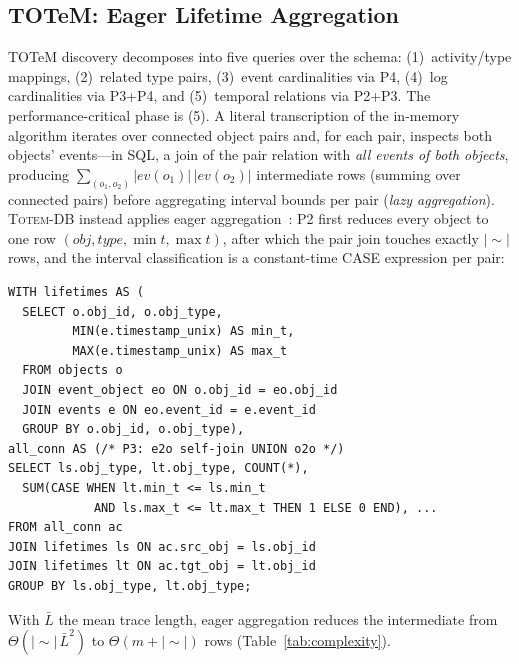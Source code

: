 \documentclass[sigconf, nonacm]{acmart}
\newcommand{\sys}{\textsc{Totem-DB}\xspace}
\begin{document}
\subsection{TOTeM: Eager Lifetime Aggregation}
\label{sec:totem-sql}

\sloppy
TOTeM discovery decomposes into five queries over the schema: (1)~activity/type mappings, (2)~related type pairs, (3)~event cardinalities via P4, (4)~log cardinalities via P3+P4, and (5)~temporal relations via P2+P3. The performance-critical phase is (5). A literal transcription of the in-memory algorithm iterates over connected object pairs and, for each pair, inspects both objects' events---in SQL, a join of the pair relation with \emph{all events of both objects}, producing $\sum_{(o_1,o_2)} |\mathit{ev}(o_1)|\,|\mathit{ev}(o_2)|$ intermediate rows (summing over connected pairs) before aggregating interval bounds per pair (\emph{lazy aggregation}). \sys instead applies eager aggregation~\cite{yan1995eager}: P2 first reduces every object to one row $(\mathit{obj}, \mathit{type}, \min t, \max t)$, after which the pair join touches exactly $|{\sim}|$ rows, and the interval classification is a constant-time CASE expression per pair:\par\fussy

\begin{lstlisting}[caption={TOTeM temporal relations (P2+P3, abbreviated): lifetimes are aggregated before the pair join; the four CASE sums classify interval containment and overlap order.},label={lst:totem}]
WITH lifetimes AS (
  SELECT o.obj_id, o.obj_type,
         MIN(e.timestamp_unix) AS min_t,
         MAX(e.timestamp_unix) AS max_t
  FROM objects o
  JOIN event_object eo ON o.obj_id = eo.obj_id
  JOIN events e ON eo.event_id = e.event_id
  GROUP BY o.obj_id, o.obj_type),
all_conn AS (/* P3: e2o self-join UNION o2o */)
SELECT ls.obj_type, lt.obj_type, COUNT(*),
  SUM(CASE WHEN lt.min_t <= ls.min_t
            AND ls.max_t <= lt.max_t THEN 1 ELSE 0 END), ...
FROM all_conn ac
JOIN lifetimes ls ON ac.src_obj = ls.obj_id
JOIN lifetimes lt ON ac.tgt_obj = lt.obj_id
GROUP BY ls.obj_type, lt.obj_type;
\end{lstlisting}

With $\bar{L}$ the mean trace length, eager aggregation reduces the intermediate from $\Theta(|{\sim}|\,\bar{L}^2)$ to $\Theta(m + |{\sim}|)$ rows (Table~\ref{tab:complexity}).
\end{document}
